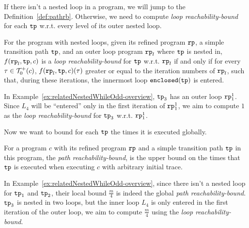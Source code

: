 If there isn't a nested loop in a program, we will jump to the Definition~\ref{def:pathrb}.
Otherwise, we need to compute \emph{loop reachability-bound}
for each $\mathtt{tp}$ w.r.t. every level of its outer nested loop.
\begin{defn}
For the program with nested loops, given its refined program $\mathtt{rp}$, a simple transition path $\mathtt{tp}$, and an outer loop
program $\mathtt{rp}_l$ where $\mathtt{tp}$ is nested in,
$f(\mathtt{rp}_l, \mathtt{tp}, c)$ is a \emph{loop reachability-bound} for $\mathtt{tp}$ w.r.t. $\mathtt{rp}_l$ if and only if
for every $\mathtt{\tau} \in \mathcal{T}^{+}_0(c)$, $f(\mathtt{rp}_l, \mathtt{tp}, c)(\mathtt{\tau})$ greater or equal to the
iteration numbers of $\mathtt{rp}_l$,
such that,
during these iterations, the innermost loop $\mathtt{enclosed(\mathtt{tp})}$ is entered.
\end{defn}
In Example~\ref{ex:relatedNestedWhileOdd-overview}, $\mathtt{tp}_3$ has an outer loop $\mathtt{rp}_1^1$. Since $L_4$ will be ``entered'' only in the first iteration of $\mathtt{rp}_1^1$,
we aim to compute $1$ as the \emph{loop reachability-bound} for $\mathtt{tp}_3$ w.r.t. $\mathtt{rp}_1^1$.

Now we want to bound for each $\mathtt{tp}$ the times it is executed globally.
\begin{defn}
For a program $c$ with its refined program $\mathtt{rp}$ and a simple transition path $\mathtt{tp}$ in this program, 
the \emph{path reachability-bound},
is the upper bound on the
times that $\mathtt{tp}$ is executed when executing $c$ with arbitrary initial trace.
\end{defn}
%
In Example~\ref{ex:relatedNestedWhileOdd-overview}, since there isn't a nested loop for $\mathtt{tp}_1$ and $\mathtt{tp}_2$, their local bound $\frac{m}{4}$ is indeed the global \emph{path reachability-bound}.
$\mathtt{tp}_3$ is nested in two loops, but the inner loop $L_4$ is only entered in the first iteration of the outer loop, we aim to compute $\frac{m}{4}$ using the \emph{loop reachability-bound}.

